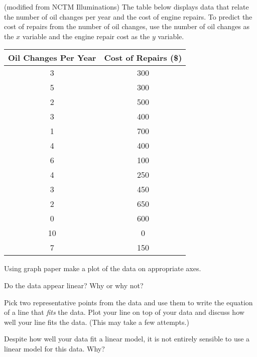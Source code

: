 \begin{exercises} 

\item (modified from NCTM Illuminations) The table below displays data that relate the number of oil changes per year and the
    cost of engine repairs.  To predict the cost of repairs from the number of oil
    changes, use the number of oil changes as the $x$ variable and the engine repair cost
    as the $y$ variable.  
    \begin{center}
        \begin{tabular}[h!]{|c|c|}
            \hline
            Oil Changes Per Year & Cost of Repairs (\$) \\ \hline \hline
            3 & 300 \\ 
            5 & 300 \\ 
            2 & 500 \\
            3 & 400 \\ 
            1 & 700 \\
            4 & 400 \\
            6 & 100 \\
            4 & 250 \\ 
            3 & 450 \\
            2 & 650 \\
            0 & 600 \\ 
            10 & 0 \\
            7 & 150 \\ \hline
        \end{tabular}
    \end{center}

    \ba
    \item Using graph paper make a plot of the data on appropriate axes.
    \item Do the data appear linear?  Why or why not?
    \item Pick two representative points from the data and use them to write the
        equation of a line that {\it fits} the data.  Plot your line on top of your data
        and discuss how well your line fits the
        data.   (This may take a few attempts.)
    \item Despite how well your data fit a linear model, it is not entirely sensible to
        use a linear model for this data.  Why?
    \ea
    
\begin{exerciseSolution}
\end{exerciseSolution}



\end{exercises}

